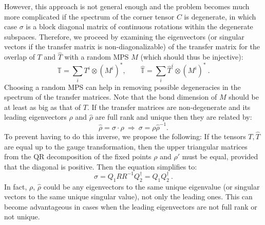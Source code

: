 \documentclass[twocolumn,floatfix,superscriptaddress,longbibliography,pra]{revtex4-2}
\begin{document}
However, this approach is not general enough and the problem becomes much more complicated if the spectrum of the corner tensor $C$ is degenerate, in which case $\sigma$ is a block diagonal matrix of continuous rotations within the degenerate subspaces. Therefore, we proceed by examining the eigenvectors (or singular vectors if the transfer matrix is non-diagonalizable) of the transfer matrix for the overlap of $T$ and $\hat{T}$ with a random MPS $M$ (which should thus be injective):
\begin{equation}
\mathbb{T} = \sum_i T^i \otimes (M^i)^*, \qquad \hat{\mathbb{T}} = \sum_i \hat{T}^i \otimes (M^i)^*\ .
\end{equation}
Choosing a random MPS can help in removing possible degeneracies in the spectrum of the transfer matrices. Note that the bond dimension of $M$ should be at least as big as that of $T$. If the transfer matrices are non-degenerate and its leading eigenvectors $\rho$  and $\hat{\rho}$ are full rank and unique then they are related by:
\begin{equation}
\hat{\rho} = \sigma\cdot \rho ~\Rightarrow~ \sigma = \rho \hat{\rho}^{-1}.
\end{equation}
To prevent having to do this inverse, we propose the following: If the tensors $T,\hat{T}$ are equal up to the gauge transformation, then the upper triangular matrices from the QR decomposition of the fixed points $\rho$ and $\rho'$ must be equal, provided that the diagonal is positive. Then the equation simplifies to: 
\begin{equation}
\sigma = Q_1 R R^{-1} Q_2^\dagger = Q_1 Q_2^\dagger\ .
\end{equation}
In fact, $\rho$, $\hat{\rho}$  could be any eigenvectors to the same unique eigenvalue (or singular vectors to the same unique singular value), not only the leading ones. This can become advantageous in cases when the leading eigenvectors are not full rank or not unique. 
\end{document}
